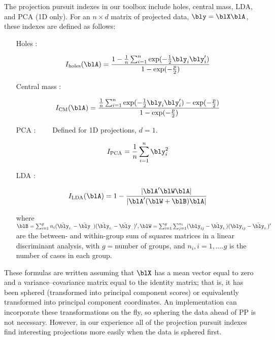 The projection pursuit indexes in our toolbox include holes, central
mass, LDA, and PCA (1D only). For an $n\times d$ matrix of projected
data, $\bly=\blX\blA$, these indexes are defined as follows:

\begin{itemize}
\item[Holes]:

\[
I_{\rm holes}(\blA)= \frac{1-\frac{1}{n}\sum_{i=1}^{n}\exp(-\frac{1}{2}\bly_i\bly_i')}{1-\exp(-\frac{p}{2})}
\]

\item[Central mass]:

\[
I_{\rm CM}(\blA)= \frac{\frac{1}{n}\sum_{i=1}^{n}\exp(-\frac{1}{2}\bly_i\bly_i')-\exp(-\frac{p}{2})}{1-\exp(-\frac{p}{2})}
\]

\item[PCA]: ~~~~Defined for 1D projections, $d=1$.

\[
I_{\rm PCA} = \frac{1}{n} \sum_{i=1}^n \bly_i^2
\]

\newpage
\item[LDA]:

\[
I_{\rm LDA}(\blA) = 1- \frac{|\blA'\blW\blA|}{|\blA'(\blW+\blB)\blA|}
\]

\noindent 
where $\blB = \sum_{i=1}^g
n_i(\bar{\bly}_{i.}-\bar{\bly}_{..})(\bar{\bly}_{i.}-\bar{\bly}_{..})',
\blW=\sum_{i=1}^g\sum_{j=1}^{n_i}
(\bly_{ij}-\bar{\bly}_{i.})(\bly_{ij}-\bar{\bly}_{i.})'$ are the
between- and within-group sum of squares matrices in a linear
discriminant analysis, with $g=$number of groups, and $n_i, i=1, ....
g$ is the number of cases in each group. 

\end{itemize}

 These formulas are written assuming that $\blX$ has 
a mean vector equal to zero and a variance--covariance matrix equal to
the identity matrix; that is, it has been sphered (transformed into
principal component scores) or equivalently transformed into principal
component coordinates. An implementation can incorporate these
transformations on the fly, so sphering the data ahead of PP is not
necessary. However, in our experience all of the projection pursuit
indexes find interesting projections more easily when the data is
sphered first.


